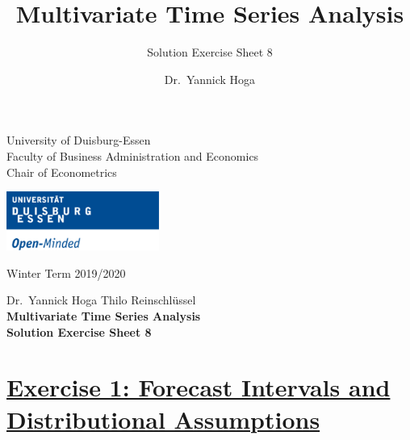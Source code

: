 \documentclass[12pt,a4paper]{article}
\title{Multivariate Time Series Analysis}
\subtitle{Solution Exercise Sheet 8}
\author{Dr.~Yannick Hoga}
\date{}
\newcommand{\tmpsection}[1]{}
\let\tmpsection=\section
\renewcommand{\section}[1]{\tmpsection{\underline{#1}} }
\begin{document}





\restoregeometry



\begin{minipage}{0.6\textwidth}
University of Duisburg-Essen\\
Faculty of Business Administration and Economics\\
Chair of Econometrics\\
\end{minipage}

	\begin{flushright}
	\vspace{-3cm}
	\includegraphics*[width=5cm]{../Includes/duelogo_en.png}\\
	\vspace{.125cm}
	\end{flushright}
\hspace{-0.005cm}Winter Term 2019/2020

\vspace{0.05cm}

\begin{center}
	\vspace{.25cm}
	Dr.~Yannick Hoga \hspace{.5cm} Thilo Reinschlüssel \\
	\vspace{.25cm}
	\textbf{\Large{Multivariate Time Series Analysis}}\\
	\vspace{.25cm}
	\textbf{\large{Solution Exercise Sheet 8}}\\
	\vspace{.125cm}
\end{center}





\hypertarget{exercise-1-forecast-intervals-and-distributional-assumptions}{%
\section{Exercise 1: Forecast Intervals and Distributional
Assumptions}\label{exercise-1-forecast-intervals-and-distributional-assumptions}}
\end{document}

